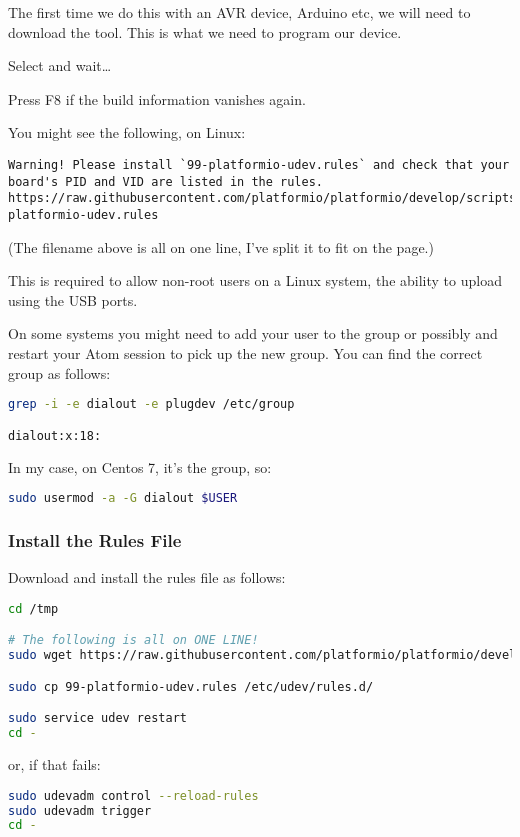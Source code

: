 The first time we do this with an AVR device,  Arduino etc, we will need to download the  tool. This is what we need to program our device.

Select  and wait\ldots{}

Press F8 if the build information vanishes again.

You might see the following, on Linux:

\begin{lstlisting}
Warning! Please install `99-platformio-udev.rules` and check that your board's PID and VID are listed in the rules.
https://raw.githubusercontent.com/platformio/platformio/develop/scripts/99-platformio-udev.rules
\end{lstlisting}

(The filename above is all on one line, I've split it to fit on the page.)

This is required to allow non-root users on a Linux system, the ability
to upload using the USB ports. 

On some systems you might need to add your 
user to the group  or possibly  and 
restart your Atom session to pick up the new group. You can find the correct group
as follows:

\begin{lstlisting}[language=bash]
grep -i -e dialout -e plugdev /etc/group

dialout:x:18:
\end{lstlisting}

In my case, on Centos 7, it's the  group, so:

\begin{lstlisting}[language=bash]
sudo usermod -a -G dialout $USER
\end{lstlisting}


\subsubsection{Install the Rules File}\label{install-the-rules-file}

Download and install the rules file as follows:

\begin{lstlisting}[language=bash]
cd /tmp

# The following is all on ONE LINE!
sudo wget https://raw.githubusercontent.com/platformio/platformio/develop/scripts/99-platformio-udev.rules

sudo cp 99-platformio-udev.rules /etc/udev/rules.d/

sudo service udev restart
cd -
\end{lstlisting}

or, if that fails:

\begin{lstlisting}[language=bash]
sudo udevadm control --reload-rules
sudo udevadm trigger
cd -
\end{lstlisting}


